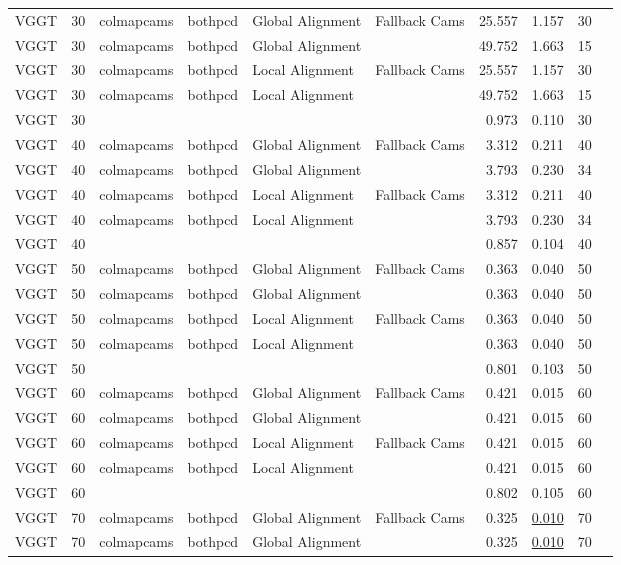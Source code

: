 \begin{table}[H]
\begin{tabular}{lrllllrrrr}
VGGT & 30 & colmapcams & bothpcd & Global Alignment & Fallback Cams & 25.557 & 1.157 & 30 &  \\
VGGT & 30 & colmapcams & bothpcd & Global Alignment &  & 49.752 & 1.663 & 15 &  \\
VGGT & 30 & colmapcams & bothpcd & Local Alignment & Fallback Cams & 25.557 & 1.157 & 30 &  \\
VGGT & 30 & colmapcams & bothpcd & Local Alignment &  & 49.752 & 1.663 & 15 &  \\
VGGT & 30 &  &  &  &  & 0.973 & 0.110 & 30 &  \\
VGGT & 40 & colmapcams & bothpcd & Global Alignment & Fallback Cams & 3.312 & 0.211 & 40 &  \\
VGGT & 40 & colmapcams & bothpcd & Global Alignment &  & 3.793 & 0.230 & 34 &  \\
VGGT & 40 & colmapcams & bothpcd & Local Alignment & Fallback Cams & 3.312 & 0.211 & 40 &  \\
VGGT & 40 & colmapcams & bothpcd & Local Alignment &  & 3.793 & 0.230 & 34 &  \\
VGGT & 40 &  &  &  &  & 0.857 & 0.104 & 40 &  \\
VGGT & 50 & colmapcams & bothpcd & Global Alignment & Fallback Cams & 0.363 & 0.040 & 50 &  \\
VGGT & 50 & colmapcams & bothpcd & Global Alignment &  & 0.363 & 0.040 & 50 &  \\
VGGT & 50 & colmapcams & bothpcd & Local Alignment & Fallback Cams & 0.363 & 0.040 & 50 &  \\
VGGT & 50 & colmapcams & bothpcd & Local Alignment &  & 0.363 & 0.040 & 50 &  \\
VGGT & 50 &  &  &  &  & 0.801 & 0.103 & 50 &  \\
VGGT & 60 & colmapcams & bothpcd & Global Alignment & Fallback Cams & 0.421 & 0.015 & 60 &  \\
VGGT & 60 & colmapcams & bothpcd & Global Alignment &  & 0.421 & 0.015 & 60 &  \\
VGGT & 60 & colmapcams & bothpcd & Local Alignment & Fallback Cams & 0.421 & 0.015 & 60 &  \\
VGGT & 60 & colmapcams & bothpcd & Local Alignment &  & 0.421 & 0.015 & 60 &  \\
VGGT & 60 &  &  &  &  & 0.802 & 0.105 & 60 &  \\
VGGT & 70 & colmapcams & bothpcd & Global Alignment & Fallback Cams & 0.325 & \underline{0.010} & 70 &  \\
VGGT & 70 & colmapcams & bothpcd & Global Alignment &  & 0.325 & \underline{0.010} & 70 &  \\

\end{tabular}
\end{table}
